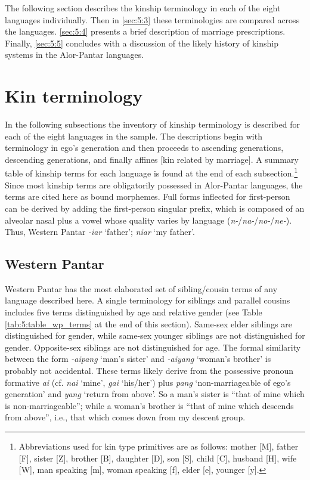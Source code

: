 The following section describes the kinship terminology in each of the eight languages individually. Then in {\SS} \ref{sec:5:3} these terminologies are compared across the languages. {\SS} \ref{sec:5:4} presents a brief description of marriage prescriptions. Finally, {\SS} \ref{sec:5:5} concludes with a discussion of the likely history of kinship systems in the Alor-Pantar languages. 


\section{Kin terminology}\label{sec:5:2}
In the following subsections the inventory of kinship terminology is described for each of the eight languages in the sample. The descriptions begin with terminology in ego's generation and then proceeds to ascending generations, descending generations, and finally affines [kin related by marriage]. A summary table of kinship terms for each language is found at the end of each subsection.\footnote{Abbreviations used for kin type primitives are as follows: mother [M], father [F], sister [Z], brother [B], daughter [D], son [S], child [C], husband [H], wife [W], man speaking [m], woman speaking [f], elder [e], younger [y].}   Since most kinship terms are obligatorily possessed in Alor-Pantar languages, the terms are cited here as bound morphemes. Full forms inflected for first-person can be derived by adding the first-person singular prefix, which is composed of an alveolar nasal plus a vowel whose quality varies by language (\textit{n-}/\textit{na-}/\textit{no-}/\textit{ne-}). Thus, Western Pantar \textit{-iar} `father'; \textit{niar} `my father'.

\subsection{Western Pantar}\label{sect_wp}
Western Pantar has the most elaborated set of sibling/cousin terms of any language described here. A single terminology for siblings and parallel cousins includes five terms distinguished by age and relative gender (see Table \ref{tab:5:table_wp_terms} at the end of this section). Same-sex elder siblings are distinguished for gender, while same-sex younger siblings are not distinguished for gender. Opposite-sex siblings are not distinguished for age. The formal similarity between the form \textit{-aipang} `man's sister' and \textit{-aiyang} `woman's brother' is probably not accidental. These terms likely derive from the possessive pronoun formative \textit{ai} (cf. \textit{nai} `mine', \textit{gai} `his/her') plus \textit{pang} `non-marriageable of ego's generation' and \textit{yang} `return from above'. So a man's sister is ``that of mine which is non-marriageable''; while a woman's brother is ``that of mine which descends from above'', i.e., that which comes down from my descent group. 

